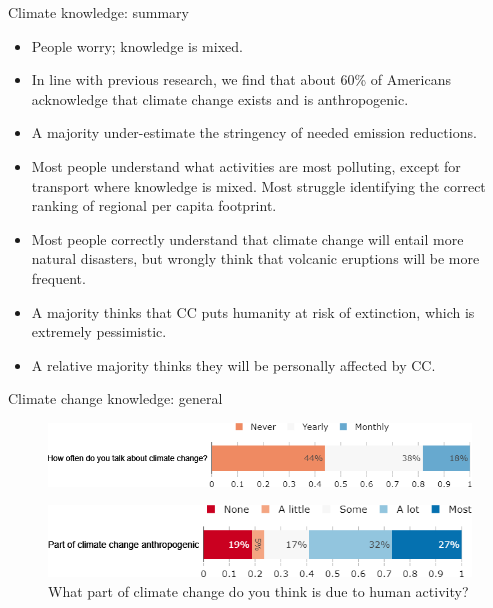 \documentclass[aspectratio=169,9pt,dvipsnames]{beamer}
\begin{document}
\begin{frame}{Climate knowledge: summary}
    \begin{itemize}
    \item People worry; knowledge is mixed.
        \item In line with previous research, we find that about 60\% of Americans acknowledge that climate change exists and is anthropogenic.
        \item A majority under-estimate the stringency of needed emission reductions. 
        \item Most people understand what activities are most polluting, except for transport where knowledge is mixed. Most struggle identifying the correct ranking of regional per capita footprint.
        \item Most people correctly understand that climate change will entail more natural disasters, but wrongly think that volcanic eruptions will be more frequent.
        \item A majority thinks that CC puts humanity at risk of extinction, which is extremely pessimistic.
        \item A relative majority thinks they will be personally affected by CC.
    \end{itemize}
\end{frame}

\begin{frame}{Climate change knowledge: general}%
\begin{figure}[h!]
\centering
\caption{How often do you think or talk with people about climate change?}
\includegraphics[width=.7\textwidth]{../figures/US/CC_talks_US.png}\\
\centering
\caption{What part of climate change do you think is due to human activity?}
\includegraphics[width=.6\textwidth]{../figures/US/CC_anthropogenic_US.png}
\end{figure}
\end{frame}
\end{document}
